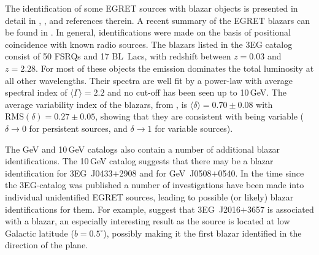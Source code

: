 The identification of some EGRET sources with blazar objects is
presented in detail in \citet{REF::VONMONTIGNY::APJ1995},
\citet{REF::MUKHERJEE::APJ1997}, \citet{REF::HARTMAN::APJS1999} and
references therein. A recent summary of the EGRET blazars can be
found in \citet{REF::MUKHERJEE::HEGRA2001}. In general,
identifications were made on the basis of positional coincidence with
known radio sources.  The blazars listed in the 3EG catalog consist
of 50 FSRQs and 17 BL~Lacs, with redshift between $z=0.03$ and
$z=2.28$. For most of these objects the \Gray emission dominates the
total luminosity at all other wavelengths. Their spectra are well fit
by a power-law with average spectral index of
$\langle\Gamma\rangle=2.2$ and no cut-off has been seen up to
10\,GeV. The average variability index of the blazars, from
\citet{REF::NOLAN::APJ2003}, is $\langle\delta\rangle=0.70\pm0.08$
with $\mathrm{RMS}(\delta)=0.27\pm0.05$, showing that they are
consistent with being variable ($\delta\rightarrow0$ for persistent
sources, and $\delta\rightarrow1$ for variable sources).

The GeV and 10\,GeV catalogs also contain a number of additional
blazar identifications. The 10\,GeV catalog suggests that there may be
a blazar identification for 3EG~J0433$+$2908 and for GeV~J0508$+$0540.  In
the time since the 3EG-catalog was published a number of
investigations have been made into individual unidentified EGRET
sources, leading to possible (or likely) blazar identifications for
them. For example, \citet{REF::MUKHERJEE::APJ2000} suggest that
3EG~J2016$+$3657 is associated with a blazar, an especially interesting
result as the source is located at low Galactic latitude
($b=0.5^\circ$), possibly making it the first blazar identified in the
direction of the plane.

